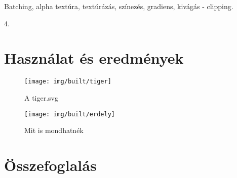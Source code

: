 \documentclass[12pt]{report}
\theoremstyle{definition}
\begin{document}
  \begin{description}[noitemsep]
    \item[Kulcsszavak] Batching, alpha textúra, textúrázás, színezés,
    gradiens, kivágás - clipping.
    \item[Becsült oldalszám] 4.
  \end{description}


    \chapter{Használat és eredmények}

  \begin{wrapfigure}{l}{0.5\textwidth}
  \begin{center}
    \texttt{[image: img/built/tiger]}
  \end{center}
    \caption{\label{tiger} A tiger.svg}
  \end{wrapfigure}

  \begin{figure}[!htb]
    \centering
    \texttt{[image: img/built/erdely]}
    \caption{\label{erdely} Mit is mondhatnék}
  \end{figure}


    \chapter{Összefoglalás}



    {}
    

\end{document}

